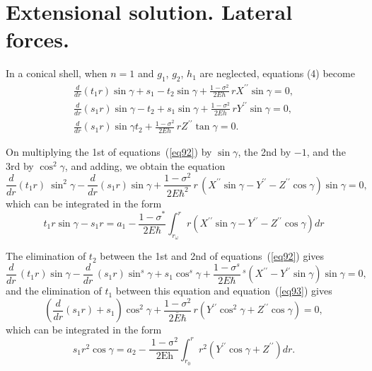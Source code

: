 \section{Extensional solution. Lateral forces.} %
In a conical shell, when
\(n=1\) and
\(g_1\), \(g_2\), \(h_1\)
are neglected, equations (4) become
\begin{equation}\label{eq92}
\begin{array}{l}{{\displaystyle\frac{d}{d r}\left(t_{1}r\right)\sin\gamma+s_{1}
-t_{2}\sin\gamma+\frac{1-\sigma^{2}}{2E h}\,r X^{\prime\prime}\sin\gamma=0,}}\\
{{\displaystyle\frac{d}{d r}\left(s_{1}r\right)\sin\gamma-t_{2}+s_{1}\sin\gamma+
\frac{1-\sigma^{2}}{2E h}\,r Y^{\prime\prime}\sin\gamma=0,}}\\
{{\displaystyle
\frac{d}{d r}\left(s_{1}r\right)\sin\gamma
t_{2} +\frac{1-\sigma^{2}}{2E h}\,r Z^{\prime\prime}\tan\gamma=0.}}\end{array}
\end{equation}

On multiplying the 1st of equations~(\ref{eq92}) by
\(\sin \gamma \), the 2nd by
\(-1\), and the 3rd by
\(\cos^2 \gamma \), and adding, we obtain the equation
\[
{\frac{d}{d r}}(t_{1}r)\ \sin^{2}\gamma-{\frac{d}{d r}}(s_{1}r)\sin\gamma+{\frac{1-\sigma^{2}}{2E\hbar^{2}}}\,r\,(X^{\prime\prime}\sin\gamma-Y^{\prime\prime}-Z^{\prime\prime}\cos\gamma)\sin\gamma=0,
\]
which can be integrated in the form
\begin{equation}\label{eq93}
t_{1}r\sin\gamma-s_{1}r=a_{1}-{\frac{1-\sigma^{*}}{2E\hbar}}\int_{r_{\omega}}^{r}r\left(X^{\prime\prime}\sin\gamma-Y^{\prime\prime}-Z^{\prime\prime}\cos\gamma \right)d r
\end{equation}

The elimination of \(t_2\) between the 1st and 2nd of equations~(\ref{eq92}) gives
\[
{\frac{d}{d r}}\,(t_{1}r)\sin\gamma-{\frac{d}{d r}}\,(s_{1}r)\sin^{s}\gamma+s_{1}\cos^{s}\gamma+{\frac{1-\sigma^{s}}{2E{\hbar}}}\,{}^{s}(X^{\prime\prime}-Y^{\prime\prime}\sin\gamma)\sin\gamma=0,
\]
and the elimination of \(t_1\) between this equation and equation~(\ref{eq93}) gives
\[
\left(\frac{d}{d r}\left(s_{1}r\right)+s_{1}\right)
\cos^{2}\gamma+\frac{1-\sigma^{2}}{2\bar{E}\hbar}\,r\left(Y^{\prime\prime}\cos^{2}\gamma+Z^{\prime\prime}\cos\gamma \right)=0,
\]
which can be integrated in the form
\begin{equation}\label{eq94}
s_{1}r^{2}\cos\gamma=a_{2}-\mathrm{\frac{~1-\sigma^{2}}{~2E h}}\int_{r_{0}}^{r}r^{2}\left(Y^{\prime\prime}\cos\gamma+Z^{\prime\prime}\right)d r.
\end{equation}

